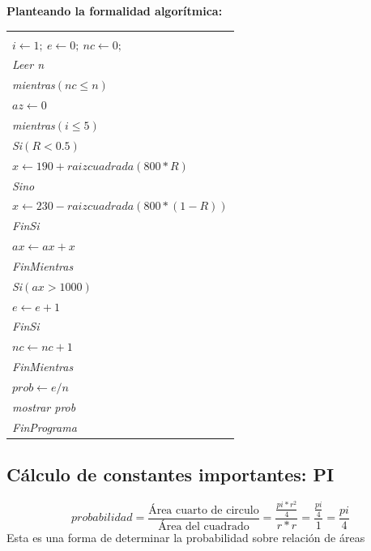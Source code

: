 \documentclass[11pt,letterpaper]{report}
\newenvironment{algoritmo}
  {\begin{center}\begin{tabular}{|p{0.85\textwidth}|}\hline\vspace{-0.2cm}\begin{tabbing}\hspace{0.6cm}\=\hspace{0.6cm}\=\hspace{0.6cm}\=\hspace{0.6cm}\=\hspace{0.6cm}\=\kill}
  {\end{tabbing}\vspace{-0.4cm}\\\hline\end{tabular}\end{center}}
\begin{document}
\textbf{Planteando la formalidad algorítmica:}

\begin{algoritmo}
\textit{ProgramaCamionTransportador}\\
\>$i \leftarrow 1;\ e \leftarrow 0;\ nc \leftarrow 0;$\\
\>\textit{Leer n}\\
\>\textit{mientras}$(nc \leq n)$\\
\>\>$az \leftarrow 0$\\
\>\>\textit{mientras}$(i \leq 5)$\\
\>\>\>\textit{Si}$(R < 0.5)$\\
\>\>\>\>$x \leftarrow 190 + raizcuadrada(800 * R)$\\
\>\>\>\textit{Sino}\\
\>\>\>\>$x \leftarrow 230 - raizcuadrada(800 * (1 - R))$\\
\>\>\>\textit{FinSi}\\
\>\>\>$ax \leftarrow ax + x$\\
\>\>\textit{FinMientras}\\
\>\>\textit{Si}$(ax > 1000)$\\
\>\>\>$e \leftarrow e + 1$\\
\>\>\textit{FinSi}\\
\>\>$nc \leftarrow nc + 1$\\
\>\textit{FinMientras}\\
\>$prob \leftarrow e/n$\\
\>\textit{mostrar prob}\\
\textit{FinPrograma}
\end{algoritmo}

\subsection*{Cálculo de constantes importantes: PI}

\begin{center}
\end{center}
\[
probabilidad = \frac{\text{Área cuarto de circulo}}{\text{Área del cuadrado}} = \frac{\frac{pi * r^2}{4}}{r * r} = \frac{\frac{pi}{4}}{1} = \frac{pi}{4}
\]
Esta es una forma de determinar la probabilidad sobre relación de áreas

\begin{center}
\end{center}
\end{document}
